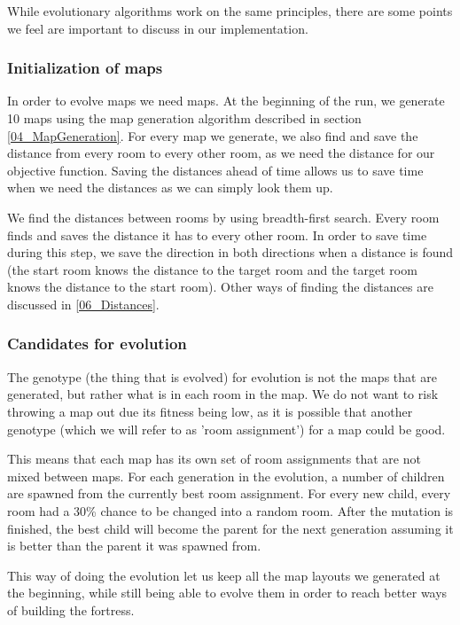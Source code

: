 While evolutionary algorithms work on the same principles, there are some points we feel are important to discuss in our implementation.

\subsubsection{Initialization of maps}
\label{04_Evolution_Initialization}

In order to evolve maps we need maps. At the beginning of the run, we generate 10 maps using the map generation algorithm described in section \ref{04_MapGeneration}. For every map we generate, we also find and save the distance from every room to every other room, as we need the distance for our objective function. Saving the distances ahead of time allows us to save time when we need the distances as we can simply look them up. 

We find the distances between rooms by using breadth-first search\cite{Dijkstra}\cite{DijkstraOriginal}. Every room finds and saves the distance it has to every other room. In order to save time during this step, we save the direction in both directions when a distance is found (the start room knows the distance to the target room and the target room knows the distance to the start room). Other ways of finding the distances are discussed in \ref{06_Distances}.

\subsubsection{Candidates for evolution}

The genotype (the thing that is evolved) for evolution is not the maps that are generated, but rather what is in each room in the map. We do not want to risk throwing a map out due its fitness being low, as it is possible that another genotype (which we will refer to as 'room assignment') for a map could be good.

This means that each map has its own set of room assignments that are not mixed between maps. For each generation in the evolution, a number of children are spawned from the currently best room assignment. For every new child, every room had a 30\% chance to be changed into a random room. After the mutation is finished, the best child will become the parent for the next generation assuming it is better than the parent it was spawned from.

This way of doing the evolution let us keep all the map layouts we generated at the beginning, while still being able to evolve them in order to reach better ways of building the fortress.

